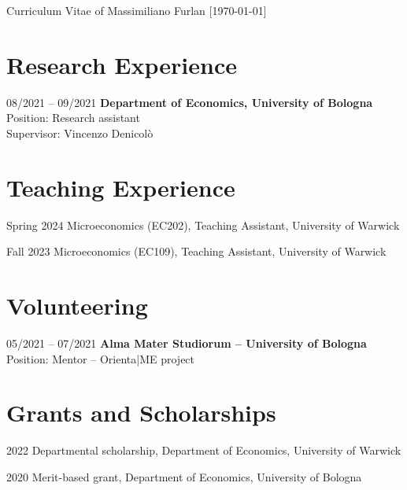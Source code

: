 \documentclass[11pt,a4paper]{article}
\begin{document}
\begin{cv}{\LARGE Curriculum Vitae of Massimiliano Furlan \large{[\mydatestyle\today]}}
\section{Research Experience}

\begin{cvlist}{}
	\item[08/2021 -- 09/2021] \textbf{Department of Economics, University of Bologna}\\
		Position: Research assistant\\
		Supervisor: Vincenzo Denicolò
\end{cvlist}
\vspace{-20pt}

\section{Teaching Experience}

\begin{cvlist}{}
  	\itemsep -4pt
	\item[Spring 2024] Microeconomics (EC202), Teaching Assistant, University of Warwick
	\item[Fall 2023] Microeconomics (EC109), Teaching Assistant, University of Warwick
	\end{cvlist}
\vspace{-20pt}

\section{Volunteering}
\begin{cvlist}{}
	\item[05/2021 -- 07/2021] \textbf{Alma Mater Studiorum – University of Bologna}\\
		Position: Mentor -- Orienta|ME project
\end{cvlist}
\vspace{-20pt}

\section{Grants and Scholarships}
\begin{cvlist}{}
	\itemsep -4pt
	\item[2022] Departmental scholarship, Department of Economics, University of Warwick 
	\item[2020] Merit-based grant, Department of Economics, University of Bologna
\end{cvlist}



\end{cv}
\end{document}
